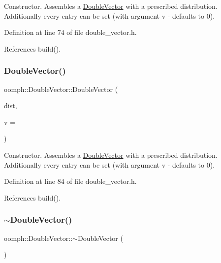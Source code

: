 Constructor. Assembles a \hyperlink{classoomph_1_1DoubleVector}{Double\+Vector} with a prescribed distribution. Additionally every entry can be set (with argument v -\/ defaults to 0). 



Definition at line 74 of file double\+\_\+vector.\+h.



References build().

\mbox{\label{classoomph_1_1DoubleVector_a29d22a13eeaa61d5467d5cfa37e1f38f}} 
\subsubsection{\texorpdfstring{Double\+Vector()}{DoubleVector()}\hspace{0.1cm}{\footnotesize\ttfamily [3/4]}}
{\footnotesize\ttfamily oomph\+::\+Double\+Vector\+::\+Double\+Vector (\begin{DoxyParamCaption}\item[{const \hyperlink{classoomph_1_1LinearAlgebraDistribution}{Linear\+Algebra\+Distribution} \&}]{dist,  }\item[{const double \&}]{v = {} }\end{DoxyParamCaption})\hspace{0.3cm}{\ttfamily [inline]}}



Constructor. Assembles a \hyperlink{classoomph_1_1DoubleVector}{Double\+Vector} with a prescribed distribution. Additionally every entry can be set (with argument v -\/ defaults to 0). 



Definition at line 84 of file double\+\_\+vector.\+h.



References build().

\mbox{\label{classoomph_1_1DoubleVector_a53441aa63f3acfa65dc4556ffa0b5573}} 
\subsubsection{\texorpdfstring{$\sim$\+Double\+Vector()}{~DoubleVector()}}
{\footnotesize\ttfamily oomph\+::\+Double\+Vector\+::$\sim$\+Double\+Vector (\begin{DoxyParamCaption}{ }\end{DoxyParamCaption})\hspace{0.3cm}{\ttfamily [inline]}}



